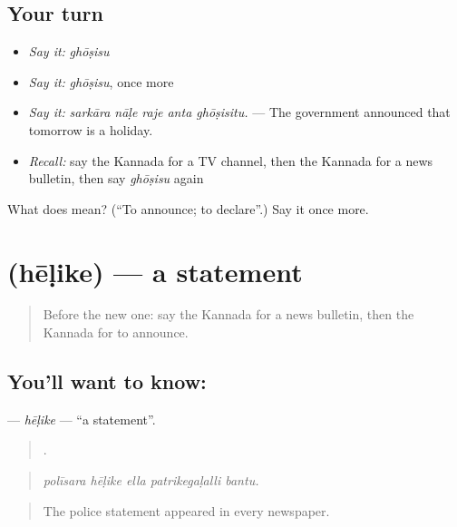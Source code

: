 \subsection*{Your turn}
\begin{itemize}
\raggedright
  \item \emph{Say it:} \emph{ghōṣisu}
  \item \emph{Say it:} \emph{ghōṣisu}, once more
  \item \emph{Say it:} \emph{sarkāra nāḷe raje anta ghōṣisitu.} — The government announced that tomorrow is a holiday.
  \item \emph{Recall:} say the Kannada for a TV channel, then the Kannada for a news bulletin, then say \emph{ghōṣisu} again
\end{itemize}

\begin{tcolorbox}[breakable,colback=teal!4,colframe=teal!35!black,title={Before you move on}]
What does  mean? (\textquotedblleft{}To announce; to declare\textquotedblright{}.) Say it once more.
\end{tcolorbox}
\section[\texorpdfstring{\kn{ಹೇಳಿಕೆ} (hēḷike)}{ಹೇಳಿಕೆ (hēḷike)}]{ (hēḷike) — a statement}

\label{lesson:KA-C329-helike}



\begin{quote}
Before the new one: say the Kannada for a news bulletin, then the Kannada for to announce.
\end{quote}

\subsection*{You'll want to know: }
\textbf{} — \emph{hēḷike} — \textquotedblleft{}a statement\textquotedblright{}.

\begin{quote}
    .
\end{quote}

\begin{quote}
\emph{polīsara hēḷike ella patrikegaḷalli bantu.}
\end{quote}

\begin{quote}
The police statement appeared in every newspaper.
\end{quote}


